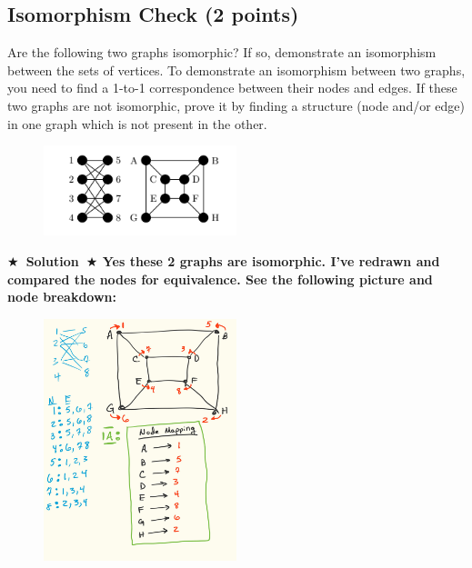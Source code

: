 \documentclass{article}
\numberwithin{figure}{section}
\newcommand{\Solution}[1]{{\medskip \color{red} \bf $\bigstar$~\sf \textbf{Solution}~$\bigstar$ \sf #1 } \bigskip}
\begin{document}
\subsection{Isomorphism Check (2 points)}
Are the following two graphs isomorphic? If so, demonstrate an isomorphism
between the sets of vertices. To demonstrate an isomorphism between two
graphs, you need to find a 1-to-1 correspondence between their nodes and edges.
If these two graphs are not isomorphic, prove it by finding a structure (node
and/or edge) in one graph which is not present in the other. 
    \begin{figure}[H]
        \centering
        \includegraphics[width=0.5\textwidth]{CS224W_Homework1/fig1.png}
        \label{fig:my_label2}
    \end{figure}

\Solution{
Yes these 2 graphs are isomorphic. I've redrawn and compared the nodes for equivalence. See the following picture and node breakdown:
\begin{figure}[H]
        \centering
\centering \includegraphics[width=0.5\textwidth]{CS224W_Homework1/node_mapping.jpg}
        \end{figure}
}
\end{document}
